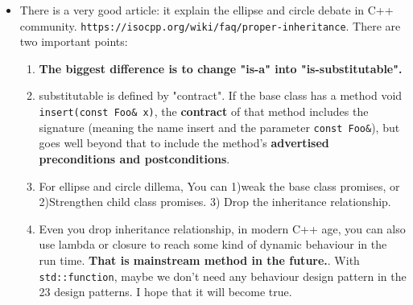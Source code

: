 \documentclass[a4paper,11pt,twoside]{book}
\begin{document}
\begin{itemize}
    \item There is a very good article: it explain the ellipse and circle debate in C++ community. \verb=https://isocpp.org/wiki/faq/proper-inheritance=. There are two important points:

        \begin{enumerate}
            \item \textbf{The biggest difference is to change "is-a" into "is-substitutable". }

            \item substitutable is defined by "contract". If the base class has a method void \texttt{insert(const Foo\& x)}, the \textbf{contract} of that method includes the signature (meaning the name insert and the parameter \texttt{const Foo\&}), but goes well beyond that to include the method’s \textbf{advertised preconditions and postconditions}. 

            \item For ellipse and circle dillema, You can 1)weak the base class promises, or 2)Strengthen child class promises. 3) Drop the inheritance relationship. 

            \item Even you drop inheritance relationship, in modern C++ age, you can also use lambda or closure to reach some kind of dynamic behaviour in the run time. \textbf{That is mainstream method in the future.}. With \texttt{std::function}, maybe we don't need any behaviour design pattern in the 23 design patterns. I hope that it will become true. 
        \end{enumerate}

\end{itemize}
\end{document}
